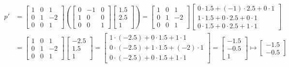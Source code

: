 \documentclass{article}
\begin{document}
\begin{align*}
	p' & =  \begin{bmatrix}1&0&1\\ 0&1&-2\\0&0&1\end{bmatrix} \left( \begin{bmatrix}0&-1&0\\ 1&0&0\\ 0&0&1\end{bmatrix}\begin{bmatrix}1.5\\ 2.5\\ 1\end{bmatrix} \right)  =  \begin{bmatrix}1&0&1\\ 0&1&-2\\0&0&1\end{bmatrix}\begin{bmatrix}0\cdot 1.5+\left(-1\right)\cdot 2.5+0\cdot 1\\ 1\cdot 1.5+0\cdot 2.5+0\cdot 1\\ 0\cdot 1.5+0\cdot 2.5+1\cdot 1\end{bmatrix} \\
	& = \begin{bmatrix}1&0&1\\ 0&1&-2\\0&0&1\end{bmatrix}\begin{bmatrix}-2.5\\ 1.5\\ 1\end{bmatrix} = \begin{bmatrix}1\cdot \left(-2.5\right)+0\cdot 1.5+1\cdot 1\\ 0\cdot \left(-2.5\right)+1\cdot 1.5+\left(-2\right)\cdot 1\\ 0\cdot \left(-2.5\right)+0\cdot 1.5+1\cdot 1\end{bmatrix} = \begin{bmatrix}-1.5\\ -0.5\\ 1\end{bmatrix} \mapsto \begin{bmatrix}-1.5\\ -0.5 \end{bmatrix}
\end{align*}
\end{document}
